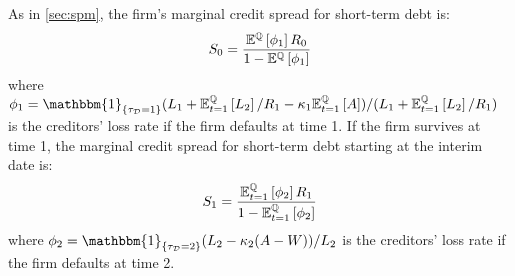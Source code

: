 \documentclass[main.tex]{subfiles}
\begin{document}
        As in \cref{sec:spm}, the firm's marginal credit spread for short-term debt is:
        \begin{equation}
            S_0 =
            \frac{
                \mathbb{E}^{\mathbb{Q}}\left[\phi_1\right]R_0
            }{
                1 - \mathbb{E}^{\mathbb{Q}}\left[\phi_1\right] 
            }
        \end{equation}
        where
        $\phi_1 = \mathbbm{1}_{\{\tau_{\mathcal{D}}=1\}} (L_{1}+\mathbb{E}_{t=1}^{\rnmeasure}\left[L_{2}\right]/R_1 - \kappa_{1}\mathbb{E}_{t=1}^{\rnmeasure}\left[A\right]) / (L_{1} + \mathbb{E}_{t=1}^{\rnmeasure}\left[L_{2}\right]/R_1)$ is the creditors' loss rate if the firm defaults at time 1. If the firm survives at time 1, the marginal credit spread for short-term debt starting at the interim date is:
        \begin{equation}
            S_1 =
            \frac{
                \mathbb{E}_{t=1}^{\mathbb{Q}}\left[\phi_2\right]R_1
            }{
                1 - \mathbb{E}_{t=1}^{\mathbb{Q}}\left[\phi_2\right] 
            }
        \end{equation}
        where $\phi_2 = \mathbbm{1}_{\{\tau_{\mathcal{D}}=2\}} (L_{2}-\kappa_{2}(A-W))/L_{2}$ is the creditors' loss rate if the firm defaults at time 2.
\end{document}
